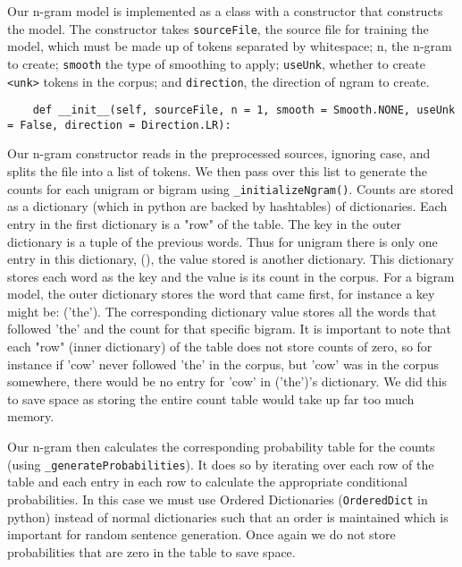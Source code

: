 \documentclass{article}
\begin{document}
Our n-gram model is implemented as a class with a constructor that constructs the model. The constructor takes \texttt{sourceFile}, the source file for training the model, which must be made up of tokens separated by whitespace; n, the n-gram to create; \texttt{smooth} the type of smoothing to apply; \texttt{useUnk}, whether to create \texttt{<unk>} tokens in the corpus; and \texttt{direction}, the direction of ngram to create.

{\small\begin{verbatim}
    def __init__(self, sourceFile, n = 1, smooth = Smooth.NONE, useUnk = False, direction = Direction.LR):
\end{verbatim}}

Our n-gram constructor reads in the preprocessed sources, ignoring case, and splits the file into a list of tokens. We then pass over this list to generate the counts for each unigram or bigram using \texttt{\_initializeNgram()}. Counts are stored as a dictionary (which in python are  backed by hashtables) of dictionaries. Each entry in the first dictionary is a "row" of the table. The key in the outer dictionary is a tuple of the previous words. Thus for unigram there is only one entry in this dictionary, (), the value stored is another dictionary. This dictionary stores each word as the key and the value is its count in the corpus. For a bigram model, the outer dictionary stores the word that came first, for instance a key might be: ('the'). The corresponding dictionary value stores all the words that followed 'the' and the count for that specific bigram. It is important to note that each "row" (inner dictionary) of the table does not store counts of zero, so for instance if 'cow' never followed 'the' in the corpus, but 'cow' was in the corpus somewhere, there would be no entry for 'cow' in ('the')'s dictionary. We did this to save space as storing the entire count table would take up far too much memory. 

Our n-gram then calculates the corresponding probability table for the counts (using \texttt{\_generateProbabilities}). It does so by iterating over each row of the table and each entry in each row to calculate the appropriate conditional probabilities. In this case we must use Ordered Dictionaries (\texttt{OrderedDict} in python) instead of normal dictionaries such that an order is maintained which is important for random sentence generation. Once again we do not store probabilities that are zero in the table to save space. 
\end{document}
